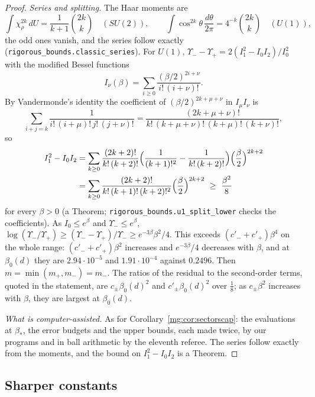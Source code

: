 \documentclass[11pt,a4paper]{article}
\theoremstyle{definition}
\theoremstyle{remark}
\newcommand{\dU}{\,dU}
\begin{document}
\begin{proof}
\emph{Series and splitting.} The Haar moments are
\[
\int\chi_\rho^{2k}\dU=\frac1{k+1}\binom{2k}k\quad(SU(2)),\qquad\int\cos^{2k}\theta\,\frac{d\theta}{2\pi}=4^{-k}\binom{2k}k\quad(U(1)),
\]
the odd ones vanish, and the series follow exactly (\texttt{rigorous\_bounds.\allowbreak classic\_series}). For $U(1)$, $\Upsilon_--\Upsilon_+=2(I_1^2-I_0I_2)/I_0^2$ with the modified Bessel functions
\[
I_\nu(\beta)=\sum_{i\ge0}\frac{(\beta/2)^{2i+\nu}}{i!\,(i+\nu)!}.
\]
By Vandermonde's identity the coefficient of $(\beta/2)^{2k+\mu+\nu}$ in $I_\mu I_\nu$ is
\[
\sum_{i+j=k}\frac1{i!\,(i+\mu)!\,j!\,(j+\nu)!}=\frac{(2k+\mu+\nu)!}{k!\,(k+\mu+\nu)!\,(k+\mu)!\,(k+\nu)!},
\]
so
\begin{align*}
I_1^2-I_0I_2&=\sum_{k\ge0}\frac{(2k+2)!}{k!\,(k+2)!}\Bigl(\frac1{(k+1)!^2}-\frac1{k!\,(k+2)!}\Bigr)\Bigl(\frac\beta2\Bigr)^{2k+2}\\
&=\sum_{k\ge0}\frac{(2k+2)!}{k!\,(k+1)!\,(k+2)!^2}\Bigl(\frac\beta2\Bigr)^{2k+2}\ \ge\ \frac{\beta^2}8
\end{align*}
for every $\beta>0$ (a Theorem; \texttt{rigorous\_bounds.\allowbreak u1\_split\_lower} checks the coefficients). As $I_0\le e^\beta$ and $\Upsilon_-\le e^\beta$,
$\log(\Upsilon_-/\Upsilon_+)\ge(\Upsilon_--\Upsilon_+)/\Upsilon_-\ge e^{-3\beta}\beta^2/4$. This exceeds $(c'_-+c'_+)\beta^4$ on the whole range: $(c'_-+c'_+)\beta^2$ increases and $e^{-3\beta}/4$ decreases
with $\beta$, and at $\beta_0(d)$ they are $2.94\cdot10^{-5}$ and $1.91\cdot10^{-4}$ against $0.2496$. Then $m=\min(m_+,m_-)=m_-$. The ratios of the residual to the second-order terms, quoted in
the statement, are $c_\pm\beta_0(d)^2$ and $c'_\pm\beta_0(d)^2$ over $\frac18$; as $c_\pm\beta^2$ increases with $\beta$, they are largest at $\beta_0(d)$.

\emph{What is computer-assisted.} As for Corollary~\ref{mg:cor:sectorscap}: the evaluations at $\beta_*$, the error budgets and the upper bounds, each made twice, by our programs and in ball
arithmetic by the eleventh referee. The series follow exactly from the moments, and the bound on $I_1^2-I_0I_2$ is a Theorem.
\end{proof}

\subsection*{Sharper constants}
\end{document}
